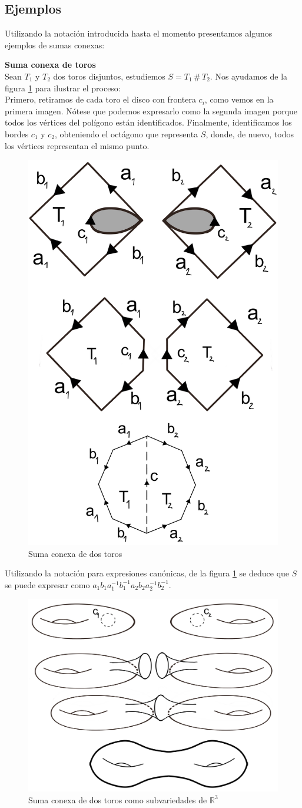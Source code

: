 \documentclass[a4paper,11pt,spanish, twoside, leqno]{tfg-uam}
\theoremstyle{definition}
\begin{document}
\subsection*{Ejemplos}
Utilizando la notación introducida hasta el momento presentamos algunos ejemplos de sumas conexas:

\noindent \textbf{Suma conexa de toros}
\\
Sean $ T_1 $ y $ T_2 $ dos toros disjuntos, estudiemos $ S=T_1\, \# \, T_2 $. Nos ayudamos de la figura \ref{fig:suma conexa de toros planos} para ilustrar el proceso:\\
Primero, retiramos de cada toro el disco con frontera $c_i$, como vemos en la primera imagen. Nótese que podemos expresarlo como la segunda imagen porque todos los vértices del polígono están identificados. Finalmente, identificamos los bordes $ c_1 $ y $ c_2 $, obteniendo el octágono que representa  $ S $, donde, de nuevo, todos los vértices representan el mismo punto.

\begin{figure}[h!]
	\centering
	\includegraphics[width=0.4\linewidth]{imagenes/sumaconexa_toros.png}
	\caption{Suma conexa de dos toros}
	\label{fig:suma conexa de toros planos}
\end{figure} 

Utilizando la notación para expresiones canónicas, de la figura \ref{fig:suma conexa de toros planos} se deduce que  $ S $ se puede expresar como $ a_1 b_1 a_1^{-1}b_1^{-1}a_2 b_2 a_2^{-1} b_2^{-1}  $. 

\begin{figure}[h!]
	\centering
	\includegraphics[width=0.4\linewidth]{imagenes/sumaconexa_toros_R3.png}
	\caption{Suma conexa de dos toros como subvariedades de $ \mathbb{R}^3 $}
	\label{fig:suma conexa de toros en R3}
\end{figure} 
\end{document}
